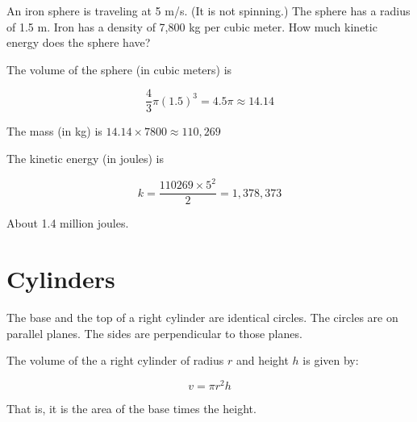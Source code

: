 \begin{Exercise}[title={Flying Sphere}, label=flying_sphere]

An iron sphere is traveling at 5 m/s. (It is not spinning.)  The
sphere has a radius of 1.5 m.  Iron has a density of 7,800 kg per
cubic meter.  How much kinetic energy does the sphere have?
\end{Exercise}
\begin{Answer}[ref=flying_sphere]
  The volume of the sphere (in cubic meters) is

  $$\frac{4}{3}\pi (1.5)^3 = 4.5 \pi \approx 14.14$$

  The mass (in kg) is $14.14 \times 7800 \approx 110,269$

  The kinetic energy (in joules) is

  $$k = \frac{110269 \times 5^2}{2} = 1,378,373$$

  About 1.4 million joules.
\end{Answer}

\section{Cylinders}

The base and the top of a right cylinder are identical circles. The
circles are on parallel planes.  The sides are perpendicular to those
planes.


\begin{mdframed}[style=important, frametitle={Volume of a cylinder}]


The volume of the a right cylinder of radius $r$ and height
$h$ is given by:

$$v = \pi r^2 h$$

That is, it is the area of the base times the height.

\end{mdframed}

